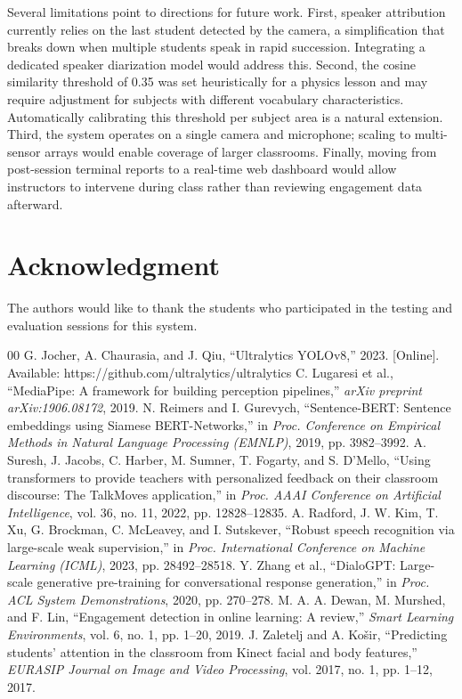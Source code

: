 \documentclass[conference]{IEEEtran}
\begin{document}
Several limitations point to directions for future work. First, speaker attribution currently relies on the last student detected by the camera, a simplification that breaks down when multiple students speak in rapid succession. Integrating a dedicated speaker diarization model would address this. Second, the cosine similarity threshold of 0.35 was set heuristically for a physics lesson and may require adjustment for subjects with different vocabulary characteristics. Automatically calibrating this threshold per subject area is a natural extension. Third, the system operates on a single camera and microphone; scaling to multi-sensor arrays would enable coverage of larger classrooms. Finally, moving from post-session terminal reports to a real-time web dashboard would allow instructors to intervene during class rather than reviewing engagement data afterward.

\section*{Acknowledgment}
The authors would like to thank the students who participated in the testing and evaluation sessions for this system.
\begin{thebibliography}{00}
 G. Jocher, A. Chaurasia, and J. Qiu, ``Ultralytics YOLOv8,'' 2023. [Online]. Available: https://github.com/ultralytics/ultralytics
 C. Lugaresi et al., ``MediaPipe: A framework for building perception pipelines,'' \emph{arXiv preprint arXiv:1906.08172}, 2019.
 N. Reimers and I. Gurevych, ``Sentence-BERT: Sentence embeddings using Siamese BERT-Networks,'' in \emph{Proc. Conference on Empirical Methods in Natural Language Processing (EMNLP)}, 2019, pp. 3982--3992.
 A. Suresh, J. Jacobs, C. Harber, M. Sumner, T. Fogarty, and S. D'Mello, ``Using transformers to provide teachers with personalized feedback on their classroom discourse: The TalkMoves application,'' in \emph{Proc. AAAI Conference on Artificial Intelligence}, vol. 36, no. 11, 2022, pp. 12828--12835.
 A. Radford, J. W. Kim, T. Xu, G. Brockman, C. McLeavey, and I. Sutskever, ``Robust speech recognition via large-scale weak supervision,'' in \emph{Proc. International Conference on Machine Learning (ICML)}, 2023, pp. 28492--28518.
 Y. Zhang et al., ``DialoGPT: Large-scale generative pre-training for conversational response generation,'' in \emph{Proc. ACL System Demonstrations}, 2020, pp. 270--278.
 M. A. A. Dewan, M. Murshed, and F. Lin, ``Engagement detection in online learning: A review,'' \emph{Smart Learning Environments}, vol. 6, no. 1, pp. 1--20, 2019.
 J. Zaletelj and A. Ko\v{s}ir, ``Predicting students' attention in the classroom from Kinect facial and body features,'' \emph{EURASIP Journal on Image and Video Processing}, vol. 2017, no. 1, pp. 1--12, 2017.
\end{thebibliography}
\end{document}
